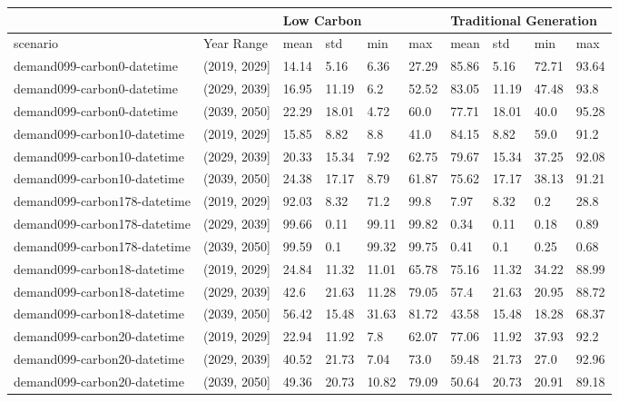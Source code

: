 \begin{table}[h]
	\begin{tabular}{|l|l|l|l|l|l|l|l|l|l|}
		\hline
		&  & \multicolumn{4}{l|}{Low Carbon} & \multicolumn{4}{l|}{Traditional Generation} \\ \hline
		scenario & Year Range & mean & std & min & max & mean & std & min & max \\ \hline
		demand099-carbon0-datetime & (2019, 2029] & 14.14 & 5.16 & 6.36 & 27.29 & 85.86 & 5.16 & 72.71 & 93.64 \\ \hline
		demand099-carbon0-datetime & (2029, 2039] & 16.95 & 11.19 & 6.2 & 52.52 & 83.05 & 11.19 & 47.48 & 93.8 \\ \hline
		demand099-carbon0-datetime & (2039, 2050] & 22.29 & 18.01 & 4.72 & 60.0 & 77.71 & 18.01 & 40.0 & 95.28 \\ \hline
		demand099-carbon10-datetime & (2019, 2029] & 15.85 & 8.82 & 8.8 & 41.0 & 84.15 & 8.82 & 59.0 & 91.2 \\ \hline
		demand099-carbon10-datetime & (2029, 2039] & 20.33 & 15.34 & 7.92 & 62.75 & 79.67 & 15.34 & 37.25 & 92.08 \\ \hline
		demand099-carbon10-datetime & (2039, 2050] & 24.38 & 17.17 & 8.79 & 61.87 & 75.62 & 17.17 & 38.13 & 91.21 \\ \hline
		demand099-carbon178-datetime & (2019, 2029] & 92.03 & 8.32 & 71.2 & 99.8 & 7.97 & 8.32 & 0.2 & 28.8 \\ \hline
		demand099-carbon178-datetime & (2029, 2039] & 99.66 & 0.11 & 99.11 & 99.82 & 0.34 & 0.11 & 0.18 & 0.89 \\ \hline
		demand099-carbon178-datetime & (2039, 2050] & 99.59 & 0.1 & 99.32 & 99.75 & 0.41 & 0.1 & 0.25 & 0.68 \\ \hline
		demand099-carbon18-datetime & (2019, 2029] & 24.84 & 11.32 & 11.01 & 65.78 & 75.16 & 11.32 & 34.22 & 88.99 \\ \hline
		demand099-carbon18-datetime & (2029, 2039] & 42.6 & 21.63 & 11.28 & 79.05 & 57.4 & 21.63 & 20.95 & 88.72 \\ \hline
		demand099-carbon18-datetime & (2039, 2050] & 56.42 & 15.48 & 31.63 & 81.72 & 43.58 & 15.48 & 18.28 & 68.37 \\ \hline
		demand099-carbon20-datetime & (2019, 2029] & 22.94 & 11.92 & 7.8 & 62.07 & 77.06 & 11.92 & 37.93 & 92.2 \\ \hline
		demand099-carbon20-datetime & (2029, 2039] & 40.52 & 21.73 & 7.04 & 73.0 & 59.48 & 21.73 & 27.0 & 92.96 \\ \hline
		demand099-carbon20-datetime & (2039, 2050] & 49.36 & 20.73 & 10.82 & 79.09 & 50.64 & 20.73 & 20.91 & 89.18 \\ \hline

\end{tabular}
\end{table}

